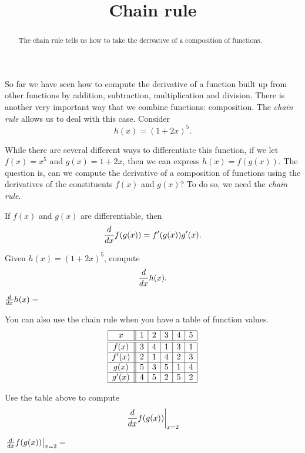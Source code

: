 \documentclass{ximera}
\title{Chain rule}
\begin{document}
\begin{abstract}
  The chain rule tells us how to take the derivative of a composition
  of functions.
\end{abstract}
\maketitle


So far we have seen how to compute the derivative of a function built
up from other functions by addition, subtraction, multiplication and
division. There is another very important way that we combine
functions: composition. The \textit{chain rule} allows us to deal with
this case. Consider
\[
h(x) = (1+2x)^5.
\] 

While there are several different ways to differentiate this function,
if we let $f(x) = x^5$ and $g(x) = 1+2x$, then we can express $h(x) =
f(g(x))$. The question is, can we compute the derivative of a
composition of functions using the derivatives of the constituents
$f(x)$ and $g(x)$? To do so, we need the \textit{chain rule}.

\begin{theorem}
If $f(x)$ and $g(x)$ are differentiable, then
\[
\frac{d}{dx} f(g(x)) = f'(g(x))g'(x).
\]
\end{theorem}

\begin{question}
  Given $h(x) = (1+2x)^5$, compute
\[
\frac{d}{dx} h(x).
\]
\begin{prompt}
$\frac{d}{dx} h(x) = $
\end{prompt}
\end{question}

You can also use the chain rule when you have a table of function
values.
\[
\begin{array}{|c||c|c|c|c|c|}
\hline
 x    & 1 & 2 & 3 & 4 & 5 \\ \hline \hline 
f(x)  & 3 & 4 & 1 & 3 & 1 \\ \hline
f'(x) & 2 & 1 & 4 & 2 & 3 \\ \hline
g(x)  & 5 & 3 & 5 & 1 & 4 \\ \hline
g'(x) & 4 & 5 & 2 & 5 & 2 \\ \hline
\end{array}
\]

\begin{question}
Use the table above to compute
\[
\left.\frac{d}{dx} f(g(x))\right|_{x=2}
\]
\begin{prompt}
$\left.\frac{d}{dx} f(g(x))\right|_{x=2}=$
\end{prompt}
\end{question}
\end{document}

